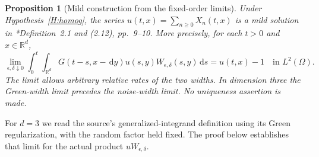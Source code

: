 \documentclass[12pt]{article}
\numberwithin{equation}{section}
\newtheorem{proposition}[theorem]{Proposition}
\theoremstyle{definition}
\newcommand{\R}{\mathbb{R}}
\newcommand{\ud}{\,\mathrm{d}}
\begin{document}
\begin{proposition}[Mild construction from the fixed-order limits]
  \label{P:mild-construction}
  Under Hypothesis~\ref{H:homog}, the series
  $u(t,x)=\sum_{n\ge0}X_n(t,x)$ is a mild solution in
  \cite{chen:author2026:time-dependency}*{Definition~2.1 and (2.12),
  pp.~9--10}. More precisely, for each $t>0$ and $x\in\R^d$,
  \begin{equation}\label{E:mild-construction}
    \lim_{\epsilon,\delta\downarrow0}
    \int_0^t\int_{\R^d}G(t-s,x-\ud y)
    u(s,y)W_{\epsilon,\delta}(s,y)\ud s
    =u(t,x)-1\quad\text{in }L^2(\Omega).
  \end{equation}
  The limit allows arbitrary relative rates of the two widths.
  In dimension three the Green-width limit precedes the noise-width
  limit. No uniqueness assertion is made.
\end{proposition}

For $d=3$ we read the source's generalized-integrand definition using its
Green regularization, with the random factor held fixed. The proof below
establishes that limit for the actual product $uW_{\epsilon,\delta}$.
\end{document}
